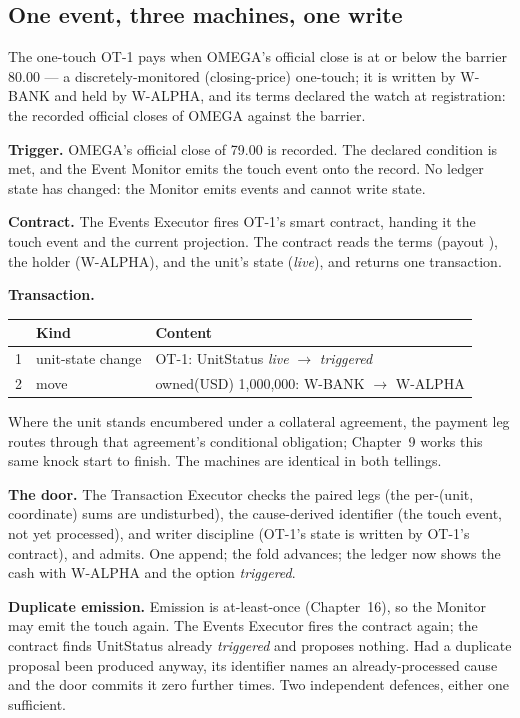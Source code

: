 \subsection{One event, three machines, one write}

The one-touch \mbox{OT-1} pays  when OMEGA's official close is at or
below the barrier 80.00 --- a discretely-monitored (closing-price) one-touch;
it is written by \mbox{W-BANK} and
held by \mbox{W-ALPHA}, and its terms declared the watch at registration: the
recorded official closes of OMEGA against the barrier.

\textbf{Trigger.} OMEGA's official close of 79.00 is recorded. The declared
condition is met, and the Event Monitor emits the touch event onto the record.
No ledger state has changed: the Monitor emits events and cannot write state.

\textbf{Contract.} The Events Executor fires OT-1's smart contract, handing it
the touch event and the current projection. The contract reads the terms
(payout ), the holder (\mbox{W-ALPHA}), and the unit's state
(\emph{live}), and returns one transaction.

\textbf{Transaction.}

\begin{center}
\begin{tabular}{@{}rll@{}}
\toprule
 & Kind & Content \\
\midrule
1 & unit-state change & OT-1: UnitStatus \emph{live} $\to$ \emph{triggered} \\
2 & move & owned(USD) 1{,}000{,}000: W-BANK $\to$ W-ALPHA \\
\bottomrule
\end{tabular}
\end{center}

Where the unit stands encumbered under a collateral agreement, the payment leg
routes through that agreement's conditional obligation; Chapter~9 works this
same knock start to finish. The machines are identical in both tellings.

\textbf{The door.} The Transaction Executor checks the paired legs (the
per-(unit, coordinate) sums are undisturbed), the cause-derived identifier (the
touch event, not yet processed), and writer discipline (OT-1's state is written
by OT-1's contract), and admits. One append; the fold advances; the ledger now
shows the cash with \mbox{W-ALPHA} and the option \emph{triggered}.

\textbf{Duplicate emission.} Emission is at-least-once (Chapter~16), so the
Monitor may emit the touch again. The Events Executor fires the contract again;
the contract finds UnitStatus already \emph{triggered} and proposes nothing.
Had a duplicate proposal been produced anyway, its identifier names an
already-processed cause and the door commits it zero further times. Two
independent defences, either one sufficient.


